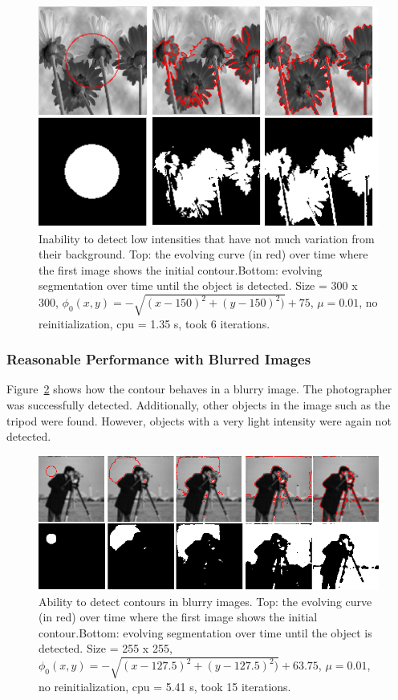 \documentclass[10pt,twocolumn,letterpaper]{article}
\begin{document}
\begin{figure}[t]
\centering
\includegraphics[width=12cm]{cv_eg7.png}
\caption{Inability to detect low intensities that have not much variation from their background.  Top: the evolving curve (in red) over time where the first
image shows the initial
contour.Bottom: evolving segmentation over time until the object is detected. Size = 300 x 300, $\phi_{0}(x,y) = - \sqrt{(x - 150)^2 + (y - 150)^2)} + 75$,
$\mu =0.01$, no reinitialization, cpu = 1.35 s, took 6 iterations.}
\label{fig:cv_eg7}
\end{figure}

\subsubsection*{Reasonable Performance with Blurred Images}

Figure~\ref{fig:cv_eg9} shows how the contour behaves in a blurry image. The photographer was successfully detected. Additionally, other objects in the image
such as the tripod were found. However, objects with a very light intensity were again not detected.

\begin{figure}[t]
\centering
\includegraphics[width=12cm]{cv_eg9.png}
\caption{Ability to detect contours in blurry images.  Top: the evolving curve (in red) over time where the first
image shows the initial
contour.Bottom: evolving segmentation over time until the object is detected. Size = 255 x 255, $\phi_{0}(x,y) = - \sqrt{(x - 127.5)^2 + (y - 127.5)^2)} +
63.75$, $\mu =0.01$, no reinitialization, cpu = 5.41 s, took 15 iterations.}
\label{fig:cv_eg9}
\end{figure}
\end{document}
